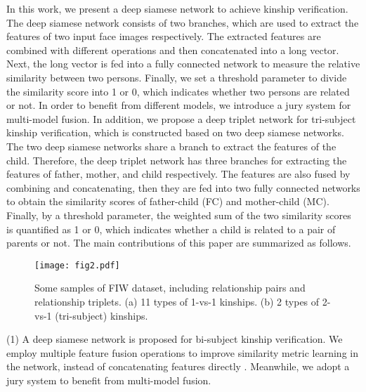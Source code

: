 \documentclass[a4paper, 10pt, conference]{ieeeconf}      %
\begin{document}
In this work, we present a deep siamese network to achieve kinship verification. The deep siamese network consists of two branches, which are used to extract the features of two input face images respectively. The extracted features are combined with different operations and then concatenated into a long vector. Next, the long vector is fed into a fully connected network to measure the relative similarity between two persons. Finally, we set a threshold parameter to divide the similarity score into 1 or 0, which indicates whether two persons are related or not. In order to benefit from different models, we introduce a jury system for multi-model fusion. In addition, we propose a deep triplet network for tri-subject kinship verification, which is constructed based on two deep siamese networks. The two deep siamese networks share a branch to extract the features of the child. Therefore, the deep triplet network has three branches for extracting the features of father, mother, and child respectively. The features are also fused by combining and concatenating, then they are fed into two fully connected networks to obtain the similarity scores of father-child (FC) and mother-child (MC). Finally, by a threshold parameter, the weighted sum of the two similarity scores is quantified as 1 or 0, which indicates whether a child is related to a pair of parents or not. The main contributions of this paper are summarized as follows.

\begin{figure}[t]
\setlength{\abovecaptionskip}{-0.0cm}
\setlength{\belowcaptionskip}{-0.24cm}
\begin{minipage}[b]{1.0\linewidth}
  \centering
  \centerline{\texttt{[image: fig2.pdf]}}
\end{minipage}
\caption{Some samples of FIW dataset, including relationship pairs and relationship triplets. (a) 11 types of 1-vs-1 kinships. (b) 2 types of 2-vs-1 (tri-subject) kinships.}
\label{fig:fig2}
\end{figure}





(1) A deep siamese network is proposed for bi-subject kinship verification. We employ multiple feature fusion operations to improve similarity metric learning in the network, instead of concatenating features directly \cite{c15}. Meanwhile, we adopt a jury system to benefit from multi-model fusion.
\end{document}
